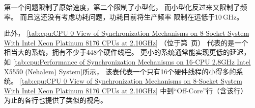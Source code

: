 {{	第一个问题限制了原始速度，第二个限制了小型化，
	而小型化反过来又限制了频率。
	而且这还没有考虑功耗问题，功耗目前将生产频率
	限制在远低于10\,GHz。

	此外，
	\cref{tab:cpu:CPU 0 View of Synchronization Mechanisms on 8-Socket System With Intel Xeon Platinum 8176 CPUs at 2.10GHz}
	（位于第~页）
	代表的是一个相当大的系统，拥有不少于448个硬件线程。
	更小的系统通常能实现更低的延迟，如
	\cref{tab:cpu:Performance of Synchronization Mechanisms on 16-CPU 2.8GHz Intel X5550 (Nehalem) System}所示，
	该表代表一个只有16个硬件线程的小得多的系统。
	\cref{tab:cpu:CPU 0 View of Synchronization Mechanisms on 8-Socket System With Intel Xeon Platinum 8176 CPUs at 2.10GHz}
	中到``Off-Core''行（含该行）为止的各行也提供了类似的视角。

\begin{table}
\renewcommand*{\arraystretch}{1.1}
\centering\small
{}
\caption{12 核 Intel Core i7-8750H @ 2.20\,GHz 系统中 CPU 0 视角的同步机制开销}
\label{tab:cpu:CPU 0 View of Synchronization Mechanisms on 12-CPU Intel Core i7-8750H CPU @ 2.20GHz}
\end{table}

}}
